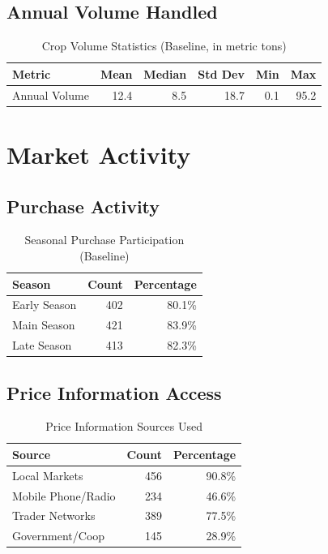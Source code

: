 \documentclass[11pt]{article}
\begin{document}
\subsection{Annual Volume Handled}

\begin{table}[h!]
\centering
\caption{Crop Volume Statistics (Baseline, in metric tons)}
\label{tab:volume}
\begin{tabularx}{0.9\textwidth}{lrrrrr}
\toprule
\textbf{Metric} & \textbf{Mean} & \textbf{Median} & \textbf{Std Dev} & \textbf{Min} & \textbf{Max} \\
\midrule
Annual Volume & 12.4 & 8.5 & 18.7 & 0.1 & 95.2 \\
\bottomrule
\end{tabularx}
\end{table}

\section{Market Activity}

\subsection{Purchase Activity}

\begin{table}[h!]
\centering
\caption{Seasonal Purchase Participation (Baseline)}
\label{tab:purchase}
\begin{tabularx}{0.8\textwidth}{lrr}
\toprule
\textbf{Season} & \textbf{Count} & \textbf{Percentage} \\
\midrule
Early Season & 402 & 80.1\% \\
Main Season & 421 & 83.9\% \\
Late Season & 413 & 82.3\% \\
\bottomrule
\end{tabularx}
\end{table}

\subsection{Price Information Access}

\begin{table}[h!]
\centering
\caption{Price Information Sources Used}
\label{tab:price_info}
\begin{tabularx}{0.8\textwidth}{lrr}
\toprule
\textbf{Source} & \textbf{Count} & \textbf{Percentage} \\
\midrule
Local Markets & 456 & 90.8\% \\
Mobile Phone/Radio & 234 & 46.6\% \\
Trader Networks & 389 & 77.5\% \\
Government/Coop & 145 & 28.9\% \\
\bottomrule
\end{tabularx}
\end{table}
\end{document}
